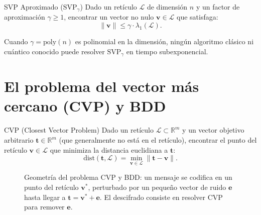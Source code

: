 \documentclass[11pt,a4paper,twoside,openright]{book}
\theoremstyle{plain}
\theoremstyle{definition}
\theoremstyle{remark}
\newcommand{\R}{\mathbb{R}}
\newcommand{\vv}[1]{\mathbf{#1}}
\begin{document}
\begin{midef}{SVP Aproximado ($\mathrm{SVP}_\gamma$)}
Dado un ret\'iculo $\mathcal{L}$ de dimensi\'on $n$ y un factor de aproximaci\'on $\gamma \geq 1$, encontrar un vector no nulo $\vv{v} \in \mathcal{L}$ que satisfaga:
\[
  \|\vv{v}\| \leq \gamma \cdot \lambda_1(\mathcal{L}).
\]
\end{midef}

Cuando $\gamma = \mathrm{poly}(n)$ es polinomial en la dimensi\'on, ning\'un algoritmo cl\'asico ni cu\'antico conocido puede resolver $\mathrm{SVP}_\gamma$ en tiempo subexponencial.

\section{El problema del vector m\'as cercano (CVP) y BDD}

\begin{midef}{CVP (Closest Vector Problem)}
Dado un ret\'iculo $\mathcal{L} \subset \R^m$ y un vector objetivo arbitrario $\vv{t} \in \R^m$ (que generalmente no est\'a en el ret\'iculo), encontrar el punto del ret\'iculo $\vv{v} \in \mathcal{L}$ que minimiza la distancia euclidiana a $\vv{t}$:
\[
  \mathrm{dist}(\vv{t}, \mathcal{L}) = \min_{\vv{v} \in \mathcal{L}} \|\vv{t} - \vv{v}\|.
\]
\end{midef}

\begin{figure}[H]
\centering
{}
\caption{Geometr\'ia del problema CVP y BDD: un mensaje se codifica en un punto del ret\'iculo $\vv{v}^*$, perturbado por un peque\~no vector de ruido $\vv{e}$ hasta llegar a $\vv{t} = \vv{v}^* + \vv{e}$. El descifrado consiste en resolver CVP para remover $\vv{e}$.}
\label{fig:cvp_geometry}
\end{figure}
\end{document}
